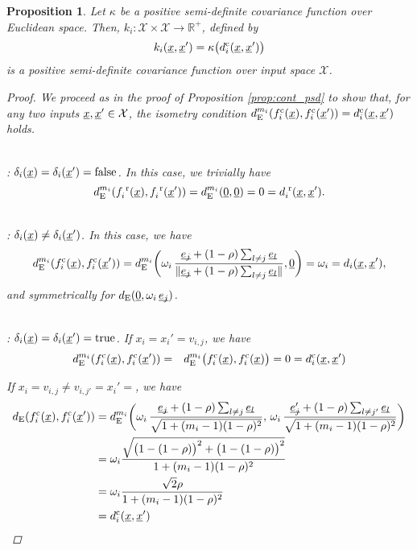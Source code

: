 \documentclass[letterpaper]{article}
\newcommand{\vect}[1]{\underline{\smash{#1}}}
\renewcommand{\v}[1]{\vect{#1}}
\newcommand{\reals}{\mathds{R}}
\newcommand{\sX}{\mathcal{X}}
\newcommand{\br}{^{\text{\textnormal{ r}}}}
\newcommand{\cat}{^{\text{\textnormal{c}}}}
\newtheorem{prop}[thm]{Proposition}
\begin{document}
\begin{prop}
Let $\kappa$ be a positive semi-definite covariance function over Euclidean space.
Then, $k_i\colon \sX \times \sX\to \reals^+$, defined by 
\[k_i(\v{x},\v{x}') = \kappa\bigl( d\cat_i(\v{x}, \v{x}') \bigr)\]
is a positive semi-definite covariance function over input space $\sX$. 
\label{prop:cat_psd}
\begin{proof}
We proceed as in the proof of Proposition \ref{prop:cont_psd} to show that, for any two inputs $\v{x},\v{x}' \in \sX$, the isometry condition $d_{\text{E}}^{m_i}(f\cat_i(\v{x}),f\cat_i(\v{x}')) = d\cat_i(\v{x},\v{x}')$ holds.

~\\: $\delta_i(\v{x}) = \delta_i(\v{x}') = \textrm{false}$.
In this case, we trivially have 
\[d_{\text{E}}^{m_i}(f_i\br(\v{x}),f_i\br(\v{x}')) = d_{\text{E}}^{m_i}(\v{0}, \v{0}) = 0 = d_i\br(\v{x},\v{x}').\]

~\\: $\delta_i(\v{x}) \neq \delta_i(\v{x}')$. In this case, we have
\[d_{\text{E}}^{m_i}(f\cat_i(\v{x}),f\cat_i(\v{x}')) = 
d_{\text{E}}^{m_i}\biggl(\omega_i\,\frac{\v{e_j}+(1-\rho)\sum_{l\neq j} \v{e_l}}
{\|\v{e_j}+(1-\rho)\sum_{l\neq j} \v{e_l}\|}, \v{0}\biggr) 
= \omega_i = d_i(\v{x},\v{x}'),\]
and symmetrically for $d_{\text{E}}(\v{0}, \omega_i\,\v{e_j})$.

~\\: $\delta_i(\v{x}) = \delta_i(\v{x}') = \textrm{true}$. 
If $x_i=x_i'=v_{i,j}$, we have 
\begin{eqnarray}
\nonumber{}d_{\text{E}}^{m_i}(f\cat_i(\v{x}),f\cat_i(\v{x}')) & = & d_{\text{E}}^{m_i}\bigl(
f\cat_i(\v{x}),f\cat_i(\v{x})
\bigr) = 0 = d\cat_i(\v{x}, \v{x}')
\end{eqnarray}

\noindent{}If $x_i=v_{i,j} \neq v_{i,j'} = x_i'=$, we have 
\begin{align} 
\nonumber{}d_{\text{E}}(f\cat_i(\v{x}),f\cat_i(\v{x}')) & = 
d_{\text{E}}^{m_i}\biggl(
\omega_i\,\frac{\v{e_j}+(1-\rho)\sum_{l\neq j} \v{e_l}}
{\sqrt{1+(m_i-1)(1-\rho)^2}},\,
\omega_i\,\frac{\v{e_j'}+(1-\rho)\sum_{l\neq j'} \v{e_l}}
{\sqrt{1+(m_i-1)(1-\rho)^2}}
\biggr) \\
& = \omega_i \frac{\sqrt{\bigl(1-(1-\rho)\bigr)^2 + \bigl(1-(1-\rho)\bigr)^2}}
{1+(m_i-1)(1-\rho)^2} \nonumber\\
& = \omega_i \frac{\sqrt{2} \rho}
{1+(m_i-1)(1-\rho)^2} \nonumber\\
& = d\cat_i(\v{x}, \v{x}')
\end{align}
\end{proof}
\end{prop}
\end{document}
